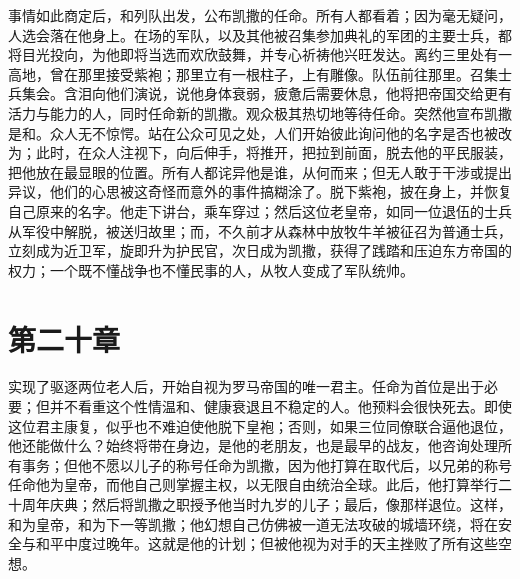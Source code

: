 事情如此商定后，和列队出发，公布凯撒的任命。所有人都看着；因为毫无疑问，人选会落在他身上。在场的军队，以及其他被召集参加典礼的军团的主要士兵，都将目光投向，为他即将当选而欢欣鼓舞，并专心祈祷他兴旺发达。离约三里处有一高地，曾在那里接受紫袍；那里立有一根柱子，上有雕像。队伍前往那里。召集士兵集会。含泪向他们演说，说他身体衰弱，疲惫后需要休息，他将把帝国交给更有活力与能力的人，同时任命新的凯撒。观众极其热切地等待任命。突然他宣布凯撒是和。众人无不惊愕。站在公众可见之处，人们开始彼此询问他的名字是否也被改为；此时，在众人注视下，向后伸手，将推开，把拉到前面，脱去他的平民服装，把他放在最显眼的位置。所有人都诧异他是谁，从何而来；但无人敢于干涉或提出异议，他们的心思被这奇怪而意外的事件搞糊涂了。脱下紫袍，披在身上，并恢复自己原来的名字。他走下讲台，乘车穿过；然后这位老皇帝，如同一位退伍的士兵从军役中解脱，被送归故里；而，不久前才从森林中放牧牛羊被征召为普通士兵，立刻成为近卫军，旋即升为护民官，次日成为凯撒，获得了践踏和压迫东方帝国的权力；一个既不懂战争也不懂民事的人，从牧人变成了军队统帅。\par


\section{第二十章}

实现了驱逐两位老人后，开始自视为罗马帝国的唯一君主。任命为首位是出于必要；但并不看重这个性情温和、健康衰退且不稳定的人。他预料会很快死去。即使这位君主康复，似乎也不难迫使他脱下皇袍；否则，如果三位同僚联合逼他退位，他还能做什么？始终将带在身边，是他的老朋友，也是最早的战友，他咨询处理所有事务；但他不愿以儿子的称号任命为凯撒，因为他打算在取代后，以兄弟的称号任命他为皇帝，而他自己则掌握主权，以无限自由统治全球。此后，他打算举行二十周年庆典；然后将凯撒之职授予他当时九岁的儿子；最后，像那样退位。这样，和为皇帝，和为下一等凯撒；他幻想自己仿佛被一道无法攻破的城墙环绕，将在安全与和平中度过晚年。这就是他的计划；但被他视为对手的天主挫败了所有这些空想。\par

